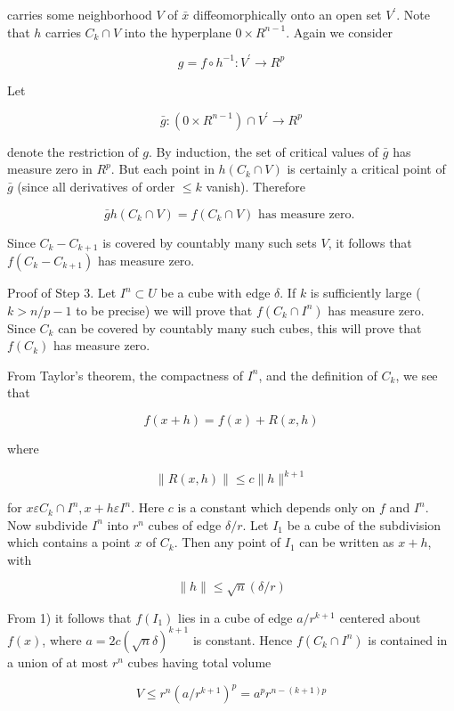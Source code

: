 \documentclass[10pt, letterpaper]{article}
\begin{document}
carries some neighborhood $V$ of $\bar{x}$ diffeomorphically onto an open set $V^{\prime}$. Note that $h$ carries $C_{k} \cap V$ into the hyperplane $0 \times R^{n-1}$. Again we consider

$$
g=f \circ h^{-1}: V^{\prime} \rightarrow R^{p}
$$

Let

$$
\bar{g}:\left(0 \times R^{n-1}\right) \cap V^{\prime} \rightarrow R^{p}
$$

denote the restriction of $g$. By induction, the set of critical values of $\bar{g}$ has measure zero in $R^{p}$. But each point in $h\left(C_{k} \cap V\right)$ is certainly a critical point of $\bar{g}$ (since all derivatives of order $\leq k$ vanish). Therefore

$$
\bar{g} h\left(C_{k} \cap V\right)=f\left(C_{k} \cap V\right) \text { has measure zero. }
$$

Since $C_{k}-C_{k+1}$ is covered by countably many such sets $V$, it follows that $f\left(C_{k}-C_{k+1}\right)$ has measure zero.

Proof of Step 3. Let $I^{n} \subset U$ be a cube with edge $\delta$. If $k$ is sufficiently large ( $k>n / p-1$ to be precise) we will prove that $f\left(C_{k} \cap I^{n}\right)$ has measure zero. Since $C_{k}$ can be covered by countably many such cubes, this will prove that $f\left(C_{k}\right)$ has measure zero.

From Taylor's theorem, the compactness of $I^{n}$, and the definition of $C_{k}$, we see that

$$
f(x+h)=f(x)+R(x, h)
$$

where

$$
\|R(x, h)\| \leq c\|h\|^{k+1}
$$

for $x \varepsilon C_{k} \cap I^{n}, x+h \varepsilon I^{n}$. Here $c$ is a constant which depends only on $f$ and $I^{n}$. Now subdivide $I^{n}$ into $r^{n}$ cubes of edge $\delta / r$. Let $I_{1}$ be a cube of the subdivision which contains a point $x$ of $C_{k}$. Then any point of $I_{1}$ can be written as $x+h$, with

$$
\|h\| \leq \sqrt{n}(\delta / r)
$$

From 1) it follows that $f\left(I_{1}\right)$ lies in a cube of edge $a / r^{k+1}$ centered about $f(x)$, where $a=2 c(\sqrt{n} \delta)^{k+1}$ is constant. Hence $f\left(C_{k} \cap I^{n}\right)$ is contained in a union of at most $r^{n}$ cubes having total volume

$$
V \leq r^{n}\left(a / r^{k+1}\right)^{p}=a^{p} r^{n-(k+1) p}
$$
\end{document}
